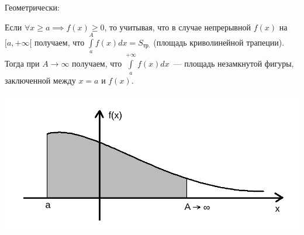 \documentclass[../../main.tex]{subfiles}
\begin{document}
Геометрически:

Если $\forall x \geq a \implies f(x) \geq 0$, то учитывая, что в случае непрерывной $f(x)$ на $[a, +\infty[$ получаем, что
$\int\limits_a^A f(x)dx = S_{\text{тр.}}$ (площадь криволинейной трапеции). Тогда при
$A \to \infty$ получаем, что $\int\limits_a^{+\infty} f(x)dx$~--- площадь незамкнутой фигуры, заключенной между $x = a$ и $f(x)$.

\includegraphics[scale = 0.3]{lec7_1.png}
\end{document}
